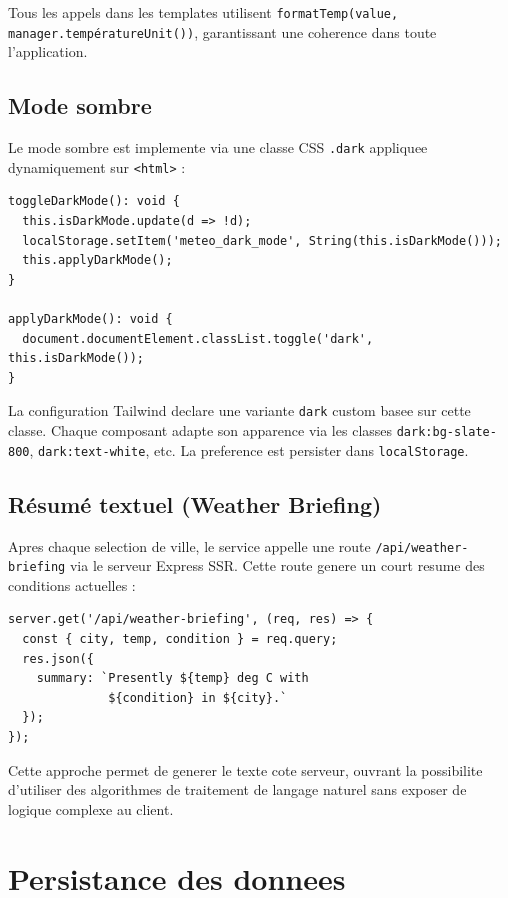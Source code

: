 \documentclass[12pt,a4paper]{article}
\begin{document}
Tous les appels dans les templates utilisent \texttt{formatTemp(value, manager.températureUnit())}, garantissant une coherence dans toute l'application.

\subsection{Mode sombre}

Le mode sombre est implemente via une classe CSS \texttt{.dark} appliquee dynamiquement sur \texttt{<html>} :

\begin{lstlisting}[style=angular, caption={Bascule du mode sombre}]
toggleDarkMode(): void {
  this.isDarkMode.update(d => !d);
  localStorage.setItem('meteo_dark_mode', String(this.isDarkMode()));
  this.applyDarkMode();
}

applyDarkMode(): void {
  document.documentElement.classList.toggle('dark', this.isDarkMode());
}
\end{lstlisting}

La configuration Tailwind declare une variante \texttt{dark} custom basee sur cette classe. Chaque composant adapte son apparence via les classes \texttt{dark:bg-slate-800}, \texttt{dark:text-white}, etc. La preference est persister dans \texttt{localStorage}.

\subsection{Résumé textuel (Weather Briefing)}

Apres chaque selection de ville, le service appelle une route \texttt{/api/weather-briefing} via le serveur Express SSR. Cette route genere un court resume des conditions actuelles :

\begin{lstlisting}[style=angular, caption={Route du serveur pour le resume textuel}]
server.get('/api/weather-briefing', (req, res) => {
  const { city, temp, condition } = req.query;
  res.json({
    summary: `Presently ${temp} deg C with
              ${condition} in ${city}.`
  });
});
\end{lstlisting}

Cette approche permet de generer le texte cote serveur, ouvrant la possibilite d'utiliser des algorithmes de traitement de langage naturel sans exposer de logique complexe au client.

\newpage
\section{Persistance des donnees}
\label{sec:persist}
\end{document}
